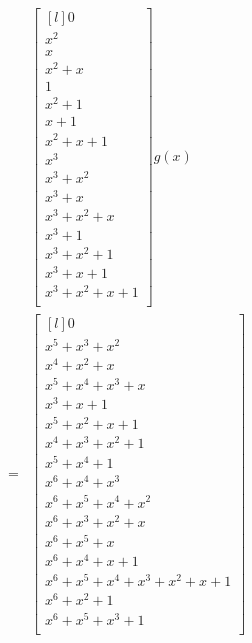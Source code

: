 \documentclass{article}
\begin{document}
\begin{equation*} \begin{aligned}
& \begin{bmatrix*}[l] 
                0 \\  
              x^2 \\
                x \\
          x^2 + x \\
                1 \\
          x^2 + 1 \\
            x + 1 \\
      x^2 + x + 1 \\
              x^3 \\
        x^3 + x^2 \\
          x^3 + x \\
    x^3 + x^2 + x \\
          x^3 + 1 \\
    x^3 + x^2 + 1 \\
      x^3 + x + 1 \\
x^3 + x^2 + x + 1 \\
\end{bmatrix*}g(x) \\
= & \begin{bmatrix*}[l]
                                          0 \\ 
                            x^5 + x^3 + x^2 \\
                              x^4 + x^2 + x \\
                x^5 + x^4 + x^3 + x \\
                                x^3 + x + 1 \\
                  x^5 + x^2 + x + 1 \\
                  x^4 + x^3 + x^2 + 1 \\
        x^5 + x^4 + 1 \\
                            x^6 + x^4 + x^3 \\
              x^6 + x^5 + x^4 + x^2 \\
                x^6 + x^3 + x^2 + x \\
      x^6 + x^5 + x \\
                  x^6 + x^4 + x + 1 \\
      x^6 + x^5 + x^4 + x^3 + x^2 + x + 1 \\
        x^6 + x^2 + 1 \\
x^6 + x^5 + x^3 + 1 \\
\end{bmatrix*} 
\end{aligned}\end{equation*}
\end{document}
